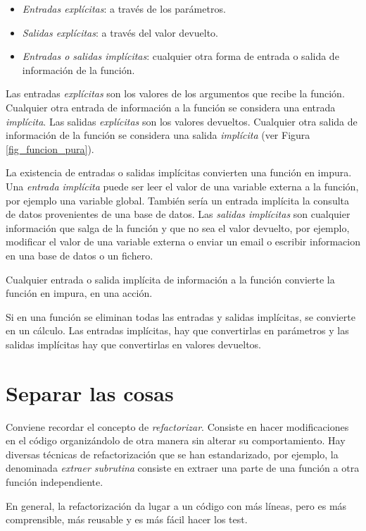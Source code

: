 \begin{itemize}
   \item \textit{Entradas explícitas}: a través de los parámetros.
   \item \textit{Salidas explícitas}: a través del valor devuelto.
   \item \textit{Entradas o salidas implícitas}: cualquier otra forma de entrada o salida de información de la función. 
\end{itemize}

Las entradas \textit{explícitas} son los valores de los argumentos que recibe la función. Cualquier otra entrada de información a la función se considera una entrada \textit{implícita}. Las salidas \textit{explícitas} son los valores devueltos. Cualquier otra salida de información de la función se considera una salida \textit{implícita} (ver Figura \ref{fig_funcion_pura}).

La existencia de entradas o salidas implícitas convierten una función en impura. Una \textit{entrada implícita} puede ser leer el valor de una variable externa a la función, por ejemplo una variable global. También sería un entrada implícita la consulta de datos provenientes de una base de datos. Las \textit{salidas implícitas} son cualquier información que salga de la función y que no sea el valor devuelto, por ejemplo, modificar el valor de una variable externa o enviar un email o escribir informacion en una base de datos o un fichero.

Cualquier entrada o salida implícita de información a la función convierte la función en impura, en una acción. 

Si en una función se eliminan todas las entradas y salidas implícitas, se convierte en un cálculo. Las entradas implícitas, hay que convertirlas en parámetros y las salidas implícitas hay que convertirlas en valores devueltos.

\section{Separar las cosas}
Conviene recordar el concepto de \textit{refactorizar}. Consiste en hacer modificaciones en el código organizándolo de otra manera sin alterar su comportamiento. Hay diversas técnicas de refactorización que se han estandarizado, por ejemplo, la denominada \textit{extraer subrutina} consiste en extraer una parte de una función a otra función independiente.

En general, la refactorización da lugar a un código con más líneas, pero es más comprensible, más reusable y es más fácil hacer los test.

